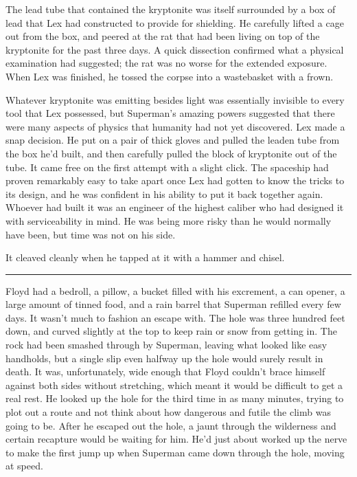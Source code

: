 \documentclass[ebook,12pt]{memoir}
\begin{document}
The lead tube that contained the kryptonite was itself surrounded by a
box of lead that Lex had constructed to provide for shielding. He
carefully lifted a cage out from the box, and peered at the rat that had
been living on top of the kryptonite for the past three days. A quick
dissection confirmed what a physical examination had suggested; the rat
was no worse for the extended exposure. When Lex was finished, he tossed
the corpse into a wastebasket with a frown.

Whatever kryptonite was emitting besides light was essentially invisible
to every tool that Lex possessed, but Superman's amazing powers
suggested that there were many aspects of physics that humanity had not
yet discovered. Lex made a snap decision. He put on a pair of thick
gloves and pulled the leaden tube from the box he'd built, and then
carefully pulled the block of kryptonite out of the tube. It came free
on the first attempt with a slight click. The spaceship had proven
remarkably easy to take apart once Lex had gotten to know the tricks to
its design, and he was confident in his ability to put it back together
again. Whoever had built it was an engineer of the highest caliber who
had designed it with serviceability in mind. He was being more risky
than he would normally have been, but time was not on his side.

It cleaved cleanly when he tapped at it with a hammer and chisel.

\begin{center}\rule{0.5\linewidth}{0.5pt}\end{center}

Floyd had a bedroll, a pillow, a bucket filled with his excrement, a can
opener, a large amount of tinned food, and a rain barrel that Superman
refilled every few days. It wasn't much to fashion an escape with. The
hole was three hundred feet down, and curved slightly at the top to keep
rain or snow from getting in. The rock had been smashed through by
Superman, leaving what looked like easy handholds, but a single slip
even halfway up the hole would surely result in death. It was,
unfortunately, wide enough that Floyd couldn't brace himself against
both sides without stretching, which meant it would be difficult to get
a real rest. He looked up the hole for the third time in as many
minutes, trying to plot out a route and not think about how dangerous
and futile the climb was going to be. After he escaped out the hole, a
jaunt through the wilderness and certain recapture would be waiting for
him. He'd just about worked up the nerve to make the first jump up when
Superman came down through the hole, moving at speed.
\end{document}
